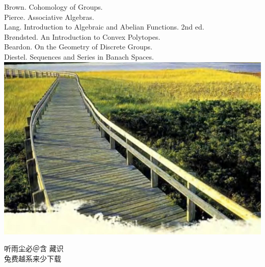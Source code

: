 \documentclass[10pt]{article}
\begin{document}
Brown. Cohomology of Groups.\\
Pierce. Associative Algebras.\\
Lang. Introduction to Algebraic and Abelian Functions. 2nd ed.\\
Brøndsted. An Introduction to Convex Polytopes.\\
Beardon. On the Geometry of Discrete Groups.\\
Diestel. Sequences and Series in Banach Spaces.\\
\includegraphics[max width=\textwidth, center]{2025_06_06_fac2836a92464059da43g-188}

听雨尘必＠含 藏识\\
兔费越系来少下载
\end{document}
